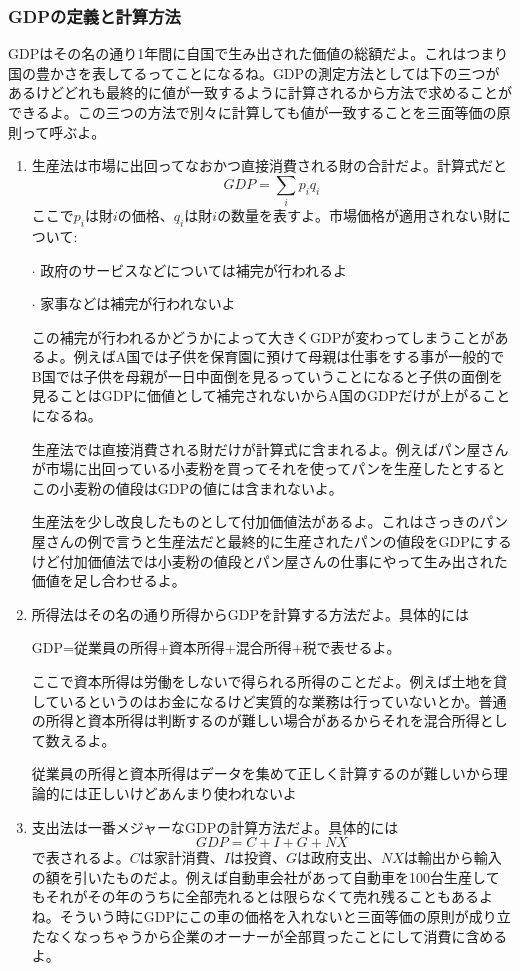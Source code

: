\documentclass[a4paper, 12pt]{article}
\begin{document}
\subsubsection{GDPの定義と計算方法}
GDPはその名の通り1年間に自国で生み出された価値の総額だよ。これはつまり国の豊かさを表してるってことになるね。GDPの測定方法としては下の三つがあるけどどれも最終的に値が一致するように計算されるから方法で求めることができるよ。この三つの方法で別々に計算しても値が一致することを三面等価の原則って呼ぶよ。
\begin{enumerate}
  \item 生産法は市場に出回ってなおかつ直接消費される財の合計だよ。計算式だと
\begin{equation*}
    GDP=\sum_i p_iq_i
\end{equation*}
ここで$p_i$は財$i$の価格、$q_i$は財$i$の数量を表すよ。市場価格が適用されない財について:

\quad $\cdot$ 政府のサービスなどについては補完が行われるよ

\quad $\cdot$ 家事などは補完が行われないよ

この補完が行われるかどうかによって大きくGDPが変わってしまうことがあるよ。例えばA国では子供を保育園に預けて母親は仕事をする事が一般的でB国では子供を母親が一日中面倒を見るっていうことになると子供の面倒を見ることはGDPに価値として補完されないからA国のGDPだけが上がることになるね。

生産法では直接消費される財だけが計算式に含まれるよ。例えばパン屋さんが市場に出回っている小麦粉を買ってそれを使ってパンを生産したとするとこの小麦粉の値段はGDPの値には含まれないよ。

生産法を少し改良したものとして付加価値法があるよ。これはさっきのパン屋さんの例で言うと生産法だと最終的に生産されたパンの値段をGDPにするけど付加価値法では小麦粉の値段とパン屋さんの仕事にやって生み出された価値を足し合わせるよ。

  \item 所得法はその名の通り所得からGDPを計算する方法だよ。具体的には

GDP=従業員の所得+資本所得+混合所得+税で表せるよ。

ここで資本所得は労働をしないで得られる所得のことだよ。例えば土地を貸しているというのはお金になるけど実質的な業務は行っていないとか。普通の所得と資本所得は判断するのが難しい場合があるからそれを混合所得として数えるよ。

従業員の所得と資本所得はデータを集めて正しく計算するのが難しいから理論的には正しいけどあんまり使われないよ

  \item
支出法は一番メジャーなGDPの計算方法だよ。具体的には
\begin{equation*}
  GDP=C+I+G+NX
\end{equation*}
で表されるよ。$C$は家計消費、$I$は投資、$G$は政府支出、$NX$は輸出から輸入の額を引いたものだよ。例えば自動車会社があって自動車を100台生産してもそれがその年のうちに全部売れるとは限らなくて売れ残ることもあるよね。そういう時にGDPにこの車の価格を入れないと三面等価の原則が成り立たなくなっちゃうから企業のオーナーが全部買ったことにして消費に含めるよ。
\end{enumerate}
\end{document}
